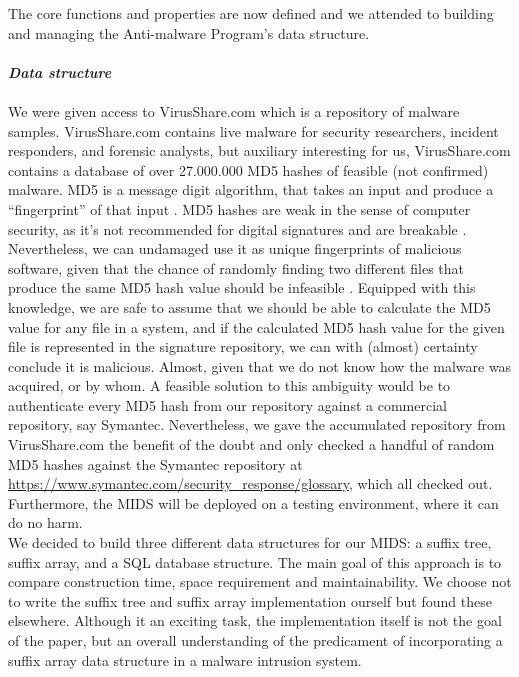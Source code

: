 \documentclass[12pt]{article} %
\begin{document}
The core functions and properties are now defined and we attended to building and managing the Anti-malware Program's data structure. 
\\ \\
\textbf{\emph{Data structure}} 
\\ \\
We were given access to VirusShare.com \cite{virusshare} which is a repository of malware samples. VirusShare.com contains live malware for security researchers, incident responders, and forensic analysts, but auxiliary interesting for us, VirusShare.com contains a database of over 27.000.000 MD5 hashes of feasible (not confirmed) malware. MD5 is a message digit algorithm, that takes an input and produce a “fingerprint” of that input \cite{turner2011updated}. MD5 hashes are weak in the sense of computer security, as it's not recommended for digital signatures \cite{turner2011updated} and are breakable  \cite{turner2011updated, wang2005break}. Nevertheless, we can undamaged use it as unique fingerprints of malicious software, given that the chance of randomly finding two different files that produce the same MD5 hash value should be infeasible \cite{thompson2005md5}. Equipped with this knowledge, we are safe to assume that we should be able to calculate the MD5 value for any file in a system,  and if the calculated MD5 hash value for the given file is represented in the signature repository, we can with (almost) certainty conclude it is malicious. Almost, given that we do not know how the malware was acquired, or by whom. A feasible solution to this ambiguity would be to authenticate every MD5 hash from our repository against a commercial repository, say Symantec. Nevertheless, we gave the accumulated repository from VirusShare.com  the benefit of the doubt and only checked a handful of random MD5 hashes against the Symantec repository at \href{https://www.symantec.com/security_response/glossary/define.jsp?letter=m&word=md5-hash}{https://www.symantec.com/security\_response/glossary}, which all checked out. Furthermore, the MIDS will be deployed on a testing environment, where it can do no harm.  \\
We decided to build three different data structures for our MIDS: a suffix tree, suffix array, and a SQL database structure. The main goal of this approach is to compare construction time, space requirement and maintainability. We choose not to write the suffix tree and suffix array implementation ourself but found these elsewhere. Although it an exciting task, the implementation itself is not the goal of the paper, but an overall understanding of the predicament of incorporating a suffix array data structure in a malware intrusion system. \\ \\
\end{document}
